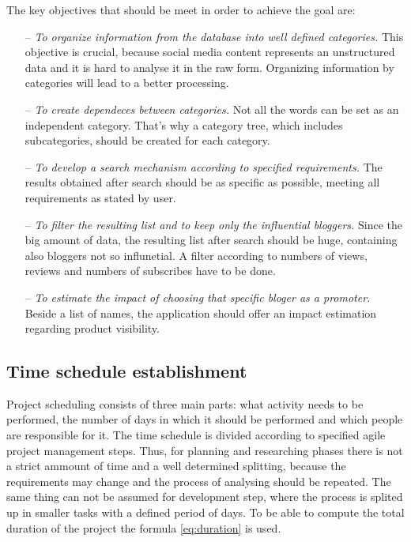 The key objectives that should be meet in order to achieve the goal are:

\begin{itemize}

\item[--] \textit{To organize information from the database into well defined categories.} This objective is crucial, because social media content represents an unstructured data and it is hard to analyse it in the raw form. Organizing information by categories will lead to a better processing.

\item[--] \textit{To create dependeces between categories.} Not all the words can be set as an independent category. That's why a category tree, which includes subcategories, should be created for each category.

\item[--] \textit{To develop a search mechanism according to specified requirements.} The results obtained after search should be as specific as possible, meeting all requirements as stated by user.

\item[--] \textit{To filter the resulting list and to keep only the influential bloggers.} Since the big amount of data, the resulting list after search should be huge, containing also bloggers not so influnetial. A filter according to numbers of views, reviews and numbers of subscribes have to be done.

\item[--] \textit{To estimate the impact of choosing that specific bloger as a promoter.} Beside a list of names, the application should offer an impact estimation regarding product visibility.

\end{itemize}

\subsection{Time schedule establishment}

Project scheduling consists of three main parts: what activity needs to be performed, the number of days in which it should be performed and which people are responsible for it. The time schedule is divided according to specified agile project management steps. Thus, for planning and researching phases there is not a strict ammount of time and a well determined splitting, because the requirements may change and the process of analysing should be repeated. The same thing can not be assumed for development step, where the process is splited up in smaller tasks with a defined period of days. To be able to compute the total duration of the project the formula \eqref{eq:duration} is used.

